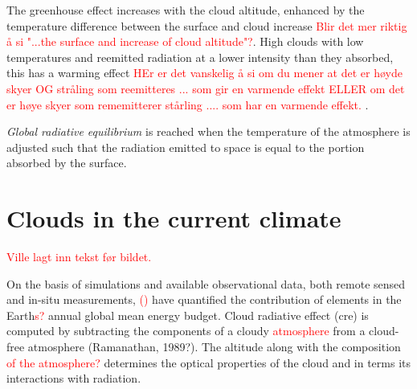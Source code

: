 The greenhouse effect increases with the cloud altitude, enhanced by the temperature difference between the surface and cloud increase \textcolor{red}{Blir det mer riktig å si "...the surface and increase of cloud altitude"?}. High clouds with low temperatures and reemitted radiation at a lower intensity than they absorbed, this has a warming effect \textcolor{red}{HEr er det vanskelig å si om du mener at det er høyde skyer OG stråling som reemitteres ... som gir en varmende effekt ELLER om det er høye skyer som rememitterer stårling .... som har en varmende effekt. }. 

\textit{Global radiative equilibrium} is reached when the temperature of the atmosphere is adjusted such that the radiation emitted to space is equal to the portion absorbed by the surface.



\section{Clouds in the current climate} \label{sec:intro_cloud_current_climate}
\textcolor{red}{Ville lagt inn tekst før bildet. }

On the basis of simulations and available observational data, both remote sensed and in-situ measurements, \citeauthor{Wild2019TheModels}  \textcolor{red}{(\citeyear{Wild2019TheModels})} have quantified the contribution of elements in the Earth\textcolor{red}{s?} annual global mean energy budget. Cloud radiative effect (\acrshort{cre}) is computed by subtracting the components of a cloudy \textcolor{red}{atmosphere} from a cloud-free atmosphere (Ramanathan, 1989?). The altitude along with the composition \textcolor{red}{of the atmosphere?} determines the optical properties of the cloud and in terms its interactions with radiation.

